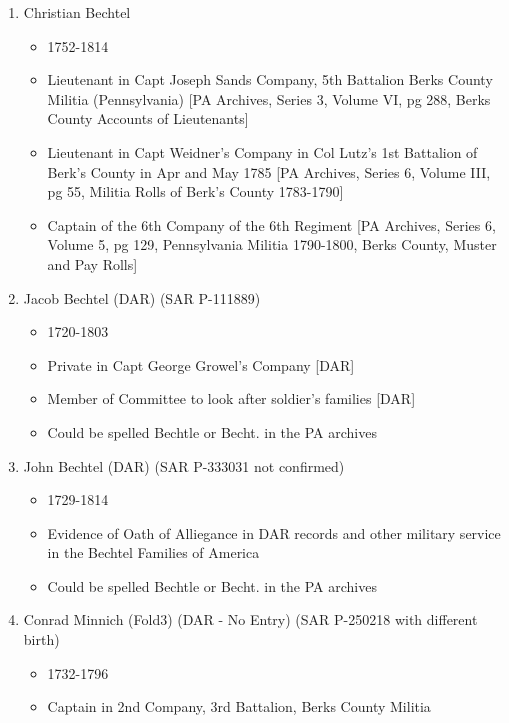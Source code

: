 \documentclass[11pt,letter]{book}
\begin{document}
\begin{enumerate}
\item Christian Bechtel
\begin{itemize}
\item 1752-1814
\item Lieutenant in Capt Joseph Sands Company, 5th Battalion Berks County Militia (Pennsylvania) [PA Archives, Series 3, Volume VI, pg 288, Berks County Accounts of Lieutenants]
\item Lieutenant in Capt Weidner's Company in Col Lutz's 1st Battalion of Berk's County in Apr and May 1785 [PA Archives, Series 6, Volume III, pg 55, Militia Rolls of Berk's County 1783-1790]
\item Captain of the 6th Company of the 6th Regiment [PA Archives, Series 6, Volume 5, pg 129, Pennsylvania Militia 1790-1800, Berks County, Muster and Pay Rolls]
\end{itemize}

\item Jacob Bechtel (DAR) (SAR P-111889)
\begin{itemize}
\item 1720-1803
\item Private in Capt George Growel's Company [DAR]
\item Member of Committee to look after soldier's families [DAR]
\item Could be spelled Bechtle or Becht. in the PA archives
\end{itemize}

\item John Bechtel (DAR) (SAR P-333031 not confirmed)
\begin{itemize}
\item 1729-1814
\item Evidence of Oath of Alliegance in DAR records and other military service in the Bechtel Families of America
\item Could be spelled Bechtle or Becht. in the PA archives
\end{itemize}
\item Conrad Minnich (Fold3) (DAR - No Entry) (SAR P-250218 with different birth)
\begin{itemize}
\item 1732-1796
\item Captain in 2nd Company, 3rd Battalion, Berks County Militia
\end{itemize}


\end{enumerate}
\end{document}
